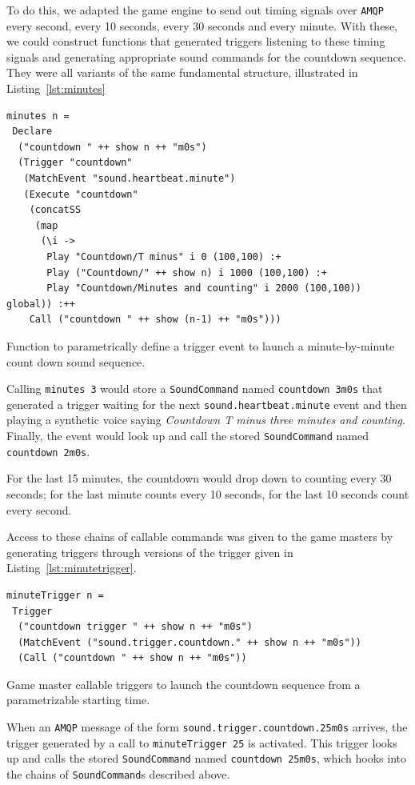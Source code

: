 To do this, we adapted the game engine to send out timing signals over
\texttt{AMQP} every second, every 10 seconds, every 30 seconds and
every minute. With these, we could construct functions that generated
triggers listening to these timing signals and generating appropriate
sound commands for the countdown sequence. They were all variants of
the same fundamental structure, illustrated in Listing~\ref{lst:minutes}

\begin{listing}
\begin{verbatim}
minutes n = 
 Declare 
  ("countdown " ++ show n ++ "m0s")
  (Trigger "countdown"
   (MatchEvent "sound.heartbeat.minute")
   (Execute "countdown" 
    (concatSS 
     (map 
      (\i -> 
       Play "Countdown/T minus" i 0 (100,100) :+
       Play ("Countdown/" ++ show n) i 1000 (100,100) :+
       Play "Countdown/Minutes and counting" i 2000 (100,100)) global)) :++
    Call ("countdown " ++ show (n-1) ++ "m0s")))
\end{verbatim}
\caption{Function to parametrically define a trigger event to launch a
minute-by-minute count down sound sequence.}
\label{lst:minutes}
\end{listing}

Calling \texttt{minutes 3} would store a \texttt{SoundCommand} named
\texttt{countdown 3m0s} that generated a trigger waiting for the next
\texttt{sound.heartbeat.minute} event and then playing a synthetic
voice saying \textit{Countdown T minus three minutes and
  counting}. Finally, the event would look up and call the stored
\texttt{SoundCommand} named \texttt{countdown 2m0s}.

For the last 15 minutes, the countdown would drop down to counting
every 30 seconds; for the last minute counts every 10 seconds, for
the last 10 seconds count every second.

Access to these chains of callable commands was given to the game
masters by generating triggers through versions of the trigger given
in Listing~\ref{lst:minutetrigger}.

\begin{listing}
\begin{verbatim}
minuteTrigger n = 
 Trigger 
  ("countdown trigger " ++ show n ++ "m0s") 
  (MatchEvent ("sound.trigger.countdown." ++ show n ++ "m0s")) 
  (Call ("countdown " ++ show n ++ "m0s"))
\end{verbatim}
\caption{Game master callable triggers to launch the countdown
  sequence from a parametrizable starting time.}
\label{lst:minutetrigger}
\end{listing}

When an \texttt{AMQP} message of the form
\texttt{sound.trigger.countdown.25m0s} arrives, the trigger generated
by a call to \texttt{minuteTrigger 25} is activated. This trigger
looks up and calls the stored \texttt{SoundCommand} named
\texttt{countdown 25m0s}, which hooks into the chains of
\texttt{SoundCommand}s described above.

